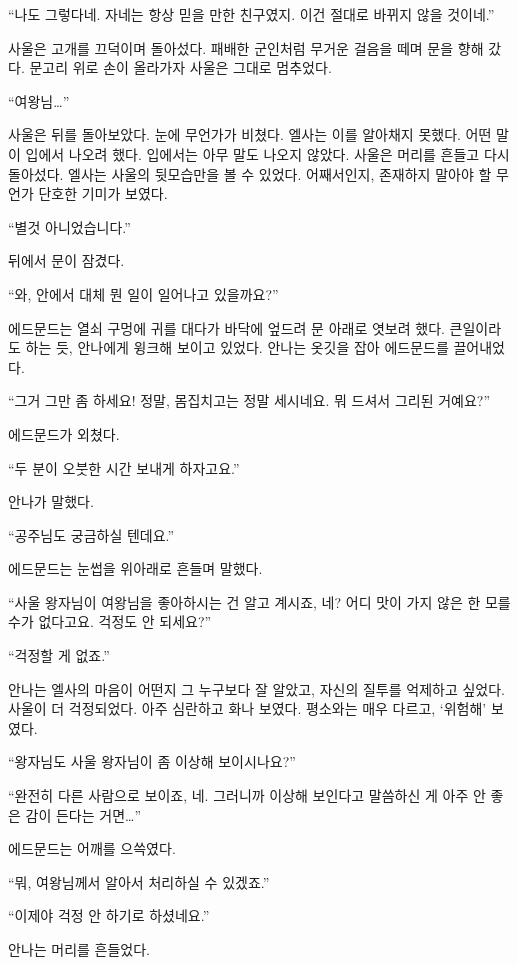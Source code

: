 ``나도 그렇다네. 자네는 항상 믿을 만한 친구였지. 이건 절대로 바뀌지 않을 것이네.''

사울은 고개를 끄덕이며 돌아섰다. 패배한 군인처럼 무거운 걸음을 떼며 문을 향해 갔다. 문고리 위로 손이 올라가자 사울은 그대로 멈추었다.

``여왕님\ldots''

사울은 뒤를 돌아보았다. 눈에 무언가가 비쳤다. 엘사는 이를 알아채지 못했다. 어떤 말이 입에서 나오려 했다. 입에서는 아무 말도 나오지 않았다. 사울은 머리를 흔들고 다시 돌아섰다. 엘사는 사울의 뒷모습만을 볼 수 있었다. 어째서인지, 존재하지 말아야 할 무언가 단호한 기미가 보였다.

``별것 아니었습니다.''

뒤에서 문이 잠겼다.

\textbreak

\forceindent``와, 안에서 대체 뭔 일이 일어나고 있을까요?''

에드문드는 열쇠 구멍에 귀를 대다가 바닥에 엎드려 문 아래로 엿보려 했다. 큰일이라도 하는 듯, 안나에게 윙크해 보이고 있었다. 안나는 옷깃을 잡아 에드문드를 끌어내었다.

``그거 그만 좀 하세요! 정말, 몸집치고는 정말 세시네요. 뭐 드셔서 그리된 거예요?''

에드문드가 외쳤다.

``두 분이 오붓한 시간 보내게 하자고요.''

안나가 말했다.

``공주님도 궁금하실 텐데요.''

에드문드는 눈썹을 위아래로 흔들며 말했다.

``사울 왕자님이 여왕님을 좋아하시는 건 알고 계시죠, 네? 어디 맛이 가지 않은 한 모를 수가 없다고요. 걱정도 안 되세요?''

``걱정할 게 없죠.''

안나는 엘사의 마음이 어떤지 그 누구보다 잘 알았고, 자신의 질투를 억제하고 싶었다. 사울이 더 걱정되었다. 아주 심란하고 화나 보였다. 평소와는 매우 다르고, `위험해' 보였다.

``왕자님도 사울 왕자님이 좀 이상해 보이시나요?''

``완전히 다른 사람으로 보이죠, 네. 그러니까 이상해 보인다고 말씀하신 게 아주 안 좋은 감이 든다는 거면\ldots''

에드문드는 어깨를 으쓱였다.

``뭐, 여왕님께서 알아서 처리하실 수 있겠죠.''

``이제야 걱정 안 하기로 하셨네요.''

안나는 머리를 흔들었다.

